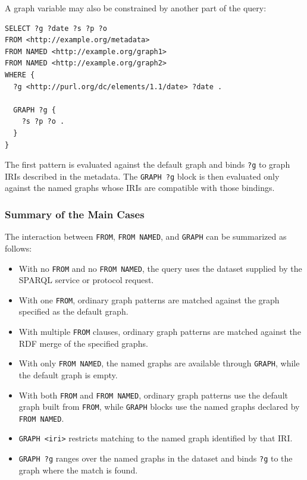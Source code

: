 \documentclass{scrbook}
\begin{document}
	A graph variable may also be constrained by another part of the query:
	
	\begin{lstlisting}
SELECT ?g ?date ?s ?p ?o
FROM <http://example.org/metadata>
FROM NAMED <http://example.org/graph1>
FROM NAMED <http://example.org/graph2>
WHERE {
  ?g <http://purl.org/dc/elements/1.1/date> ?date .

  GRAPH ?g {
    ?s ?p ?o .
  }
}
	\end{lstlisting}
	
	The first pattern is evaluated against the default graph and binds \texttt{?g} to graph IRIs described in the metadata. The \texttt{GRAPH ?g} block is then evaluated only against the named graphs whose IRIs are compatible with those bindings.
	
	\subsubsection{Summary of the Main Cases}
	
	The interaction between \texttt{FROM}, \texttt{FROM NAMED}, and \texttt{GRAPH} can be summarized as follows:
	
	\begin{itemize}
		\item With no \texttt{FROM} and no \texttt{FROM NAMED}, the query uses the dataset supplied by the SPARQL service or protocol request.
		\item With one \texttt{FROM}, ordinary graph patterns are matched against the graph specified as the default graph.
		\item With multiple \texttt{FROM} clauses, ordinary graph patterns are matched against the RDF merge of the specified graphs.
		\item With only \texttt{FROM NAMED}, the named graphs are available through \texttt{GRAPH}, while the default graph is empty.
		\item With both \texttt{FROM} and \texttt{FROM NAMED}, ordinary graph patterns use the default graph built from \texttt{FROM}, while \texttt{GRAPH} blocks use the named graphs declared by \texttt{FROM NAMED}.
		\item \texttt{GRAPH <iri>} restricts matching to the named graph identified by that IRI.
		\item \texttt{GRAPH ?g} ranges over the named graphs in the dataset and binds \texttt{?g} to the graph where the match is found.
	\end{itemize}
	
\end{document}
